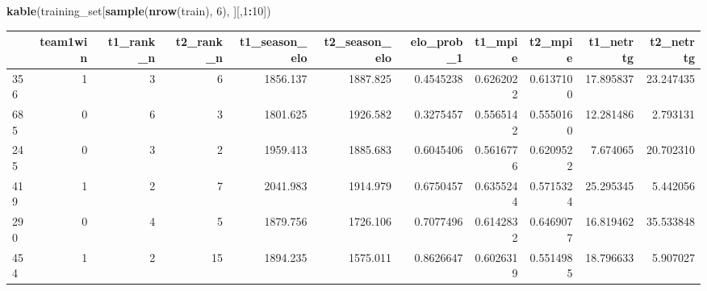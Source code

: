 \documentclass[]{article}
\newenvironment{Shaded}{\begin{snugshade}}{\end{snugshade}}
\newcommand{\KeywordTok}[1]{\textcolor[rgb]{0.13,0.29,0.53}{\textbf{#1}}}
\newcommand{\DecValTok}[1]{\textcolor[rgb]{0.00,0.00,0.81}{#1}}
\newcommand{\OperatorTok}[1]{\textcolor[rgb]{0.81,0.36,0.00}{\textbf{#1}}}
\newcommand{\NormalTok}[1]{#1}
\begin{document}
\begin{Shaded}
\begin{Highlighting}[]
\KeywordTok{kable}\NormalTok{(training_set[}\KeywordTok{sample}\NormalTok{(}\KeywordTok{nrow}\NormalTok{(train), }\DecValTok{6}\NormalTok{), ][,}\DecValTok{1}\OperatorTok{:}\DecValTok{10}\NormalTok{])}
\end{Highlighting}
\end{Shaded}

\begin{longtable}[]{@{}lrrrrrrrrrr@{}}
\toprule
& team1win & t1\_rank\_n & t2\_rank\_n & t1\_season\_elo &
t2\_season\_elo & elo\_prob\_1 & t1\_mpie & t2\_mpie & t1\_netrtg &
t2\_netrtg\tabularnewline
\midrule
\endhead
356 & 1 & 3 & 6 & 1856.137 & 1887.825 & 0.4545238 & 0.6262022 &
0.6137100 & 17.895837 & 23.247435\tabularnewline
685 & 0 & 6 & 3 & 1801.625 & 1926.582 & 0.3275457 & 0.5565142 &
0.5550160 & 12.281486 & 2.793131\tabularnewline
245 & 0 & 3 & 2 & 1959.413 & 1885.683 & 0.6045406 & 0.5616776 &
0.6209522 & 7.674065 & 20.702310\tabularnewline
419 & 1 & 2 & 7 & 2041.983 & 1914.979 & 0.6750457 & 0.6355244 &
0.5715324 & 25.295345 & 5.442056\tabularnewline
290 & 0 & 4 & 5 & 1879.756 & 1726.106 & 0.7077496 & 0.6142832 &
0.6469077 & 16.819462 & 35.533848\tabularnewline
454 & 1 & 2 & 15 & 1894.235 & 1575.011 & 0.8626647 & 0.6026319 &
0.5514985 & 18.796633 & 5.907027\tabularnewline
\bottomrule
\end{longtable}
\end{document}
